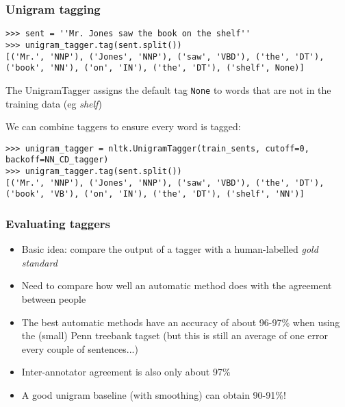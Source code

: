 \begin{frame}[fragile]\frametitle{Unigram tagging}
{\small
\begin{lstlisting}
>>> sent = ''Mr. Jones saw the book on the shelf''
>>> unigram_tagger.tag(sent.split())
[('Mr.', 'NNP'), ('Jones', 'NNP'), ('saw', 'VBD'), ('the', 'DT'), 
('book', 'NN'), ('on', 'IN'), ('the', 'DT'), ('shelf', None)]
\end{lstlisting}}

  The UnigramTagger assigns the default tag \texttt{None} to words
  that are not in the training data (eg \emph{shelf})

  
  We can combine taggers to ensure every word is tagged:
{\small
\begin{lstlisting}
>>> unigram_tagger = nltk.UnigramTagger(train_sents, cutoff=0, backoff=NN_CD_tagger)
>>> unigram_tagger.tag(sent.split())
[('Mr.', 'NNP'), ('Jones', 'NNP'), ('saw', 'VBD'), ('the', 'DT'), 
('book', 'VB'), ('on', 'IN'), ('the', 'DT'), ('shelf', 'NN')]
\end{lstlisting}}
\end{frame}


\begin{frame}[fragile]\frametitle{Evaluating taggers}
  \begin{itemize}
  \item Basic idea: compare the output of a tagger with a
    human-labelled \emph{gold standard}
  \item Need to compare how well an automatic method does with the
    agreement between people
  \item The best automatic methods have an accuracy of about 96-97\%
    when using the (small) Penn treebank tagset (but this is still an
    average of one error every couple of sentences...)
  \item Inter-annotator agreement is also only about 97\% 
  \item A good unigram baseline (with smoothing) can obtain 90-91\%!
  \end{itemize}
\end{frame}
%
%   
% 

